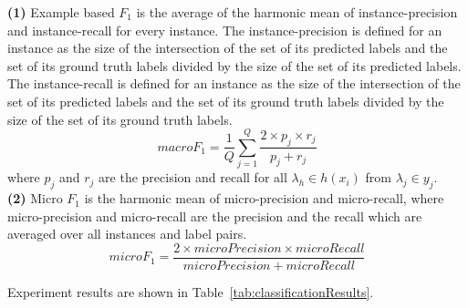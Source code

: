 \textbf{(1)}
Example based $F_{1}$ is the average of the harmonic mean of instance-precision and instance-recall for every instance. The instance-precision is defined for an instance as the size of the intersection of the set of its predicted labels and the set of its ground truth labels divided by the size of the set of its predicted labels. The instance-recall is defined for an instance as the size of the intersection of the set of its predicted labels and the set of its ground truth labels divided by the size of the set of its ground truth labels.
\begin{equation}
macroF_{1}=\frac{1}{Q}\sum_{j=1}^{Q}\frac{2 \times p_{j} \times r_{j}}{p_{j}+r_{j}}
\end{equation}
where $p_{j}$ and $r_{j}$ are the precision and recall for all $\lambda_{h} \in h(x_{i})$ from $\lambda_{j} \in y_{j}$.
\\
\textbf{(2)}
Micro $F_{1}$ is the harmonic mean of micro-precision and micro-recall, where micro-precision and micro-recall are the precision and the recall which are averaged over all instances and label pairs. 
\begin{equation}
microF_{1} = \frac{2 \times microPrecision \times microRecall}{microPrecision + microRecall}
\end{equation}



Experiment results are shown in Table~\ref{tab:classificationResults}.

